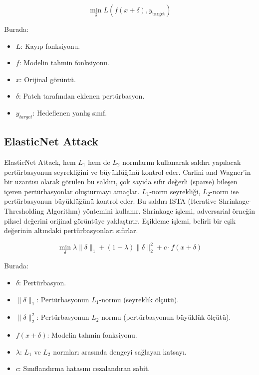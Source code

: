 \[ \min_\delta L(f(x + \delta), y_{\text{target}}) \]

Burada:

\begin{itemize}
    \item $L$: Kayıp fonksiyonu.
    \item $f$: Modelin tahmin fonksiyonu.
    \item $x$: Orijinal görüntü.
    \item $\delta$: Patch tarafından eklenen pertürbasyon.
    \item $y_{target}$: Hedeflenen yanlış sınıf.
\end{itemize}

\newpage

\subsection{ElasticNet Attack}

ElasticNet Attack, hem $L_1$ hem de $L_2$ normlarını kullanarak saldırı yapılacak pertürbasyonun seyrekliğini ve büyüklüğünü kontrol eder. Carlini and Wagner'in bir uzantısı olarak görülen bu saldırı, çok sayıda sıfır değerli (sparse) bileşen içeren pertürbasyonlar oluşturmayı amaçlar. $L_1$-norm seyrekliği, $L_2$-norm ise pertürbasyonun büyüklüğünü kontrol eder. Bu saldırı ISTA (Iterative Shrinkage-Thresholding Algorithm) yöntemini kullanır. Shrinkage işlemi, adversarial örneğin piksel değerini orijinal görüntüye yaklaştırır. Eşikleme işlemi, belirli bir eşik değerinin altındaki pertürbasyonları sıfırlar.

\[ \min_\delta \lambda \|\delta\|_1 + (1 - \lambda) \|\delta\|_2^2 + c \cdot f(x + \delta) \]

Burada:

\begin{itemize}
    \item $\delta$: Pertürbasyon.
    \item $\|\delta\|_1$: Pertürbasyonun $L_1$-normu (seyreklik ölçütü).
    \item $\|\delta\|_2^2$: Pertürbasyonun $L_2$-normu (pertürbasyonun büyüklük ölçütü).
    \item $f(x + \delta)$: Modelin tahmin fonksiyonu.
    \item $\lambda$: $L_1$ ve $L_2$ normları arasında dengeyi sağlayan katsayı.
    \item $c$: Sınıflandırma hatasını cezalandıran sabit.
\end{itemize}

